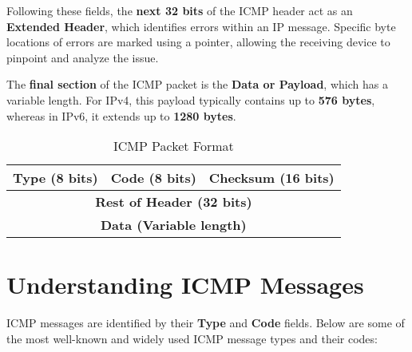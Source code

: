 Following these fields, the \textbf{next 32 bits} of the ICMP header act as an \textbf{Extended Header}, which identifies errors within an IP message. Specific byte locations of errors are marked using a pointer, allowing the receiving device to pinpoint and analyze the issue.

The \textbf{final section} of the ICMP packet is the \textbf{Data or Payload}, which has a variable length. For IPv4, this payload typically contains up to \textbf{576 bytes}, whereas in IPv6, it extends up to \textbf{1280 bytes}.

\begin{table}[h]
	\centering
	\renewcommand{\arraystretch}{1.5}
	\begin{tabular}{|c|c|c|}
		\hline
		\textbf{Type (8 bits)} & \textbf{Code (8 bits)} & \textbf{Checksum (16 bits)} \\
		\hline
		\multicolumn{3}{|c|}{\textbf{Rest of Header (32 bits)}} \\
		\hline
		\multicolumn{3}{|c|}{\textbf{Data (Variable length)}} \\
		\hline
	\end{tabular}
	\caption{ICMP Packet Format}
	\label{tab:icmp_packet}
\end{table}

\section{Understanding ICMP Messages}
ICMP messages are identified by their \textbf{Type} and \textbf{Code} fields. Below are some of the most well-known and widely used ICMP message types and their codes:

